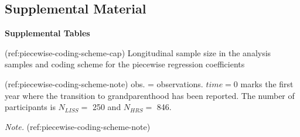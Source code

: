 \clearpage
\makeatletter
\efloat@restorefloats
\makeatother


\begin{appendix}
\renewcommand{\appendixname}{\textcolor{white}{.}}
\renewcommand{\thefigure}{S\arabic{figure}} \setcounter{figure}{0}
\renewcommand{\thetable}{S\arabic{table}} \setcounter{table}{0}

\setcounter{page}{1}

\hypertarget{supplemental-material}{%
\section{Supplemental Material}\label{supplemental-material}}

\noindent \textbf{Supplemental Tables}

(ref:piecewise-coding-scheme-cap) Longitudinal sample size in the
analysis samples and coding scheme for the piecewise regression
coefficients

(ref:piecewise-coding-scheme-note) obs. = observations. \(time=0\) marks
the first year where the transition to grandparenthood has been
reported. The number of participants is \(N_{LISS}=\) 250 and
\(N_{HRS}=\) 846.

\begin{lltable}

\begin{TableNotes}[para]
\normalsize{\textit{Note.} (ref:piecewise-coding-scheme-note)}
\end{TableNotes}

\small{

}
\end{lltable}
\end{appendix}
